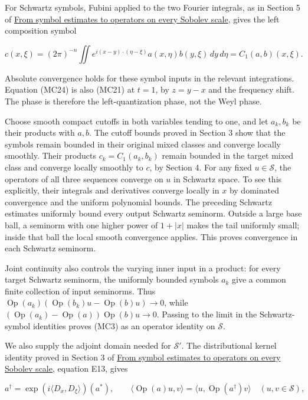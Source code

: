 \documentclass[
  11pt,
]{article}
\begin{document}
For Schwartz symbols, Fubini applied to the two Fourier integrals, as in
Section 5 of \href{euclidean-symbol-calculus.pdf}{From symbol estimates
to operators on every Sobolev scale}, gives the left composition symbol

\[
c(x,\xi)=(2\pi)^{-n}\iint
e^{i(x-y)\cdot(\eta-\xi)}a(x,\eta)b(y,\xi)\,dy\,d\eta
=C_1(a,b)(x,\xi).
\tag{MC24}
\]

Absolute convergence holds for these symbol inputs in the relevant
integrations. Equation (MC24) is also (MC21) at \(t=1\), by \(z=y-x\)
and the frequency shift. The phase is therefore the left-quantization
phase, not the Weyl phase.

Choose smooth compact cutoffs in both variables tending to one, and let
\(a_k,b_k\) be their products with \(a,b\). The cutoff bounds proved in
Section 3 show that the symbols remain bounded in their original mixed
classes and converge locally smoothly. Their products
\(c_k=C_1(a_k,b_k)\) remain bounded in the target mixed class and
converge locally smoothly to \(c\), by Section 4. For any fixed
\(u\in\mathcal S\), the operators of all three sequences converge on
\(u\) in Schwartz space. To see this explicitly, their integrals and
derivatives converge locally in \(x\) by dominated convergence and the
uniform polynomial bounds. The preceding Schwartz estimates uniformly
bound every output Schwartz seminorm. Outside a large base ball, a
seminorm with one higher power of \(1+|x|\) makes the tail uniformly
small; inside that ball the local smooth convergence applies. This
proves convergence in each Schwartz seminorm.

Joint continuity also controls the varying inner input in a product: for
every target Schwartz seminorm, the uniformly bounded symbols \(a_k\)
give a common finite collection of input seminorms. Thus
\(\operatorname{Op}(a_k)(\operatorname{Op}(b_k)u-\operatorname{Op}(b)u)\to0\),
while
\((\operatorname{Op}(a_k)-\operatorname{Op}(a))\operatorname{Op}(b)u\to0\).
Passing to the limit in the Schwartz-symbol identities proves (MC3) as
an operator identity on \(\mathcal S\).

We also supply the adjoint domain needed for \(\mathcal S'\). The
distributional kernel identity proved in Section 3 of
\href{euclidean-symbol-calculus.pdf}{From symbol estimates to operators
on every Sobolev scale}, equation E13, gives

\[
a^\dagger=\exp(i\langle D_x,D_\xi\rangle)(a^*),
\qquad
\langle\operatorname{Op}(a)u,v\rangle
=\langle u,\operatorname{Op}(a^\dagger)v\rangle
\quad(u,v\in\mathcal S),
\tag{MC25}
\]
\end{document}
